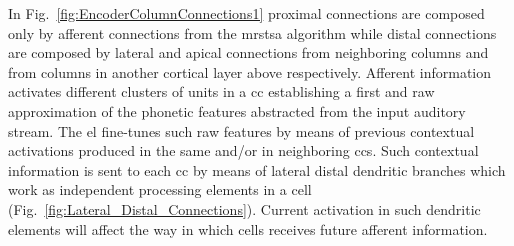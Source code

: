 {In Fig.~\ref{fig:EncoderColumnConnections1} proximal connections are composed only by afferent connections from the \gls{mrstsa} algorithm while distal connections are composed by lateral and apical connections from neighboring columns and from columns in another cortical layer above respectively. Afferent information activates different clusters of units in a \gls{cc} establishing a first and raw approximation of the phonetic features abstracted from the input auditory stream. The \gls{el} fine-tunes such raw features by means of previous contextual activations produced in the same and/or in neighboring \glspl{cc}. Such contextual information is sent to each \gls{cc} by means of lateral distal dendritic branches which work as independent processing elements in a cell (Fig.~\ref{fig:Lateral_Distal_Connections}). Current activation in such dendritic elements will affect the way in which cells receives future afferent information.

}
